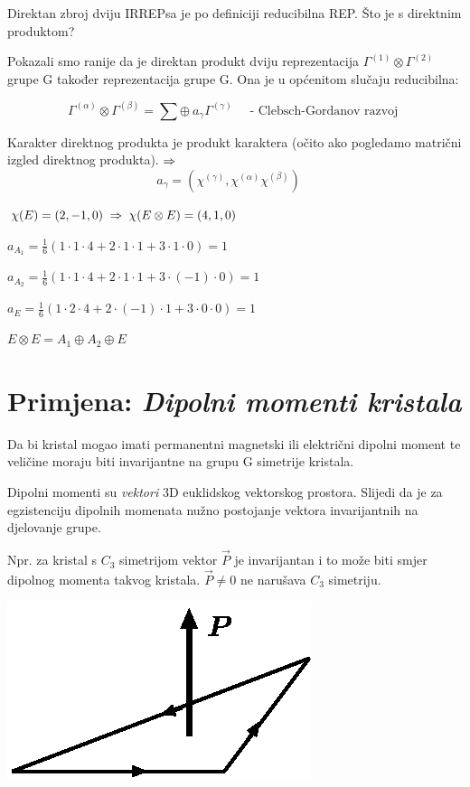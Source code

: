 Direktan zbroj dviju IRREPsa je po definiciji reducibilna REP.
Što je s direktnim produktom?

Pokazali smo ranije da je direktan produkt dviju reprezentacija
$\Gamma^{(1)} \otimes \Gamma^{(2)}$ grupe G također reprezentacija
grupe G. Ona je u općenitom slučaju reducibilna:

\begin{displaymath}
  \Gamma^{(\alpha)}\otimes\Gamma^{(\beta)} =
  \sum \oplus\: a_{\gamma}\Gamma^{(\gamma)} \quad
   \textrm{ - Clebsch-Gordanov razvoj }
\end{displaymath}


Karakter direktnog produkta je produkt karaktera (očito ako pogledamo
matrični izgled direktnog produkta).$\;\Rightarrow\;$
\begin{displaymath}
a_{\gamma}  = (\chi^{(\gamma)}, \chi^{(\alpha)}\chi^{(\beta)}) \quad
\end{displaymath}

\begin{primjer}[$E\otimes E$ u $D_3$]
$\chi(E)=(2, -1, 0) \;\Rightarrow\; \chi(E\otimes E)=(4, 1, 0)$

$a_{A_1}=\frac{1}{6}(1\cdot 1\cdot 4+2\cdot 1\cdot 1+3\cdot 1\cdot 0)=1$

$a_{A_2}=\frac{1}{6}(1\cdot 1\cdot 4+2\cdot 1\cdot 1+3\cdot (-1)\cdot 0)=1$

$a_{E}=\frac{1}{6}(1\cdot 2\cdot 4+2\cdot (-1)\cdot 1+3\cdot 0\cdot 0)=1$

$E\otimes E = A_1 \oplus A_2 \oplus E $
\end{primjer}

\section{Primjena: \emph{Dipolni momenti kristala}}

Da bi kristal mogao imati permanentni magnetski ili električni dipolni
moment te veličine moraju biti invarijantne na grupu G simetrije
kristala.

Dipolni momenti su \emph{vektori} 3D euklidskog vektorskog prostora. Slijedi
da je za egzistenciju dipolnih momenata nužno postojanje vektora 
invarijantnih na djelovanje grupe.

Npr. za kristal s $C_3$ simetrijom vektor $\vec{P}$ je invarijantan i
to može biti smjer dipolnog  momenta takvog kristala. $\vec{P}\neq 0$
ne narušava $C_3$ simetriju.

\centerline{\includegraphics[scale=1.0]{pics/dipol.eps}}

